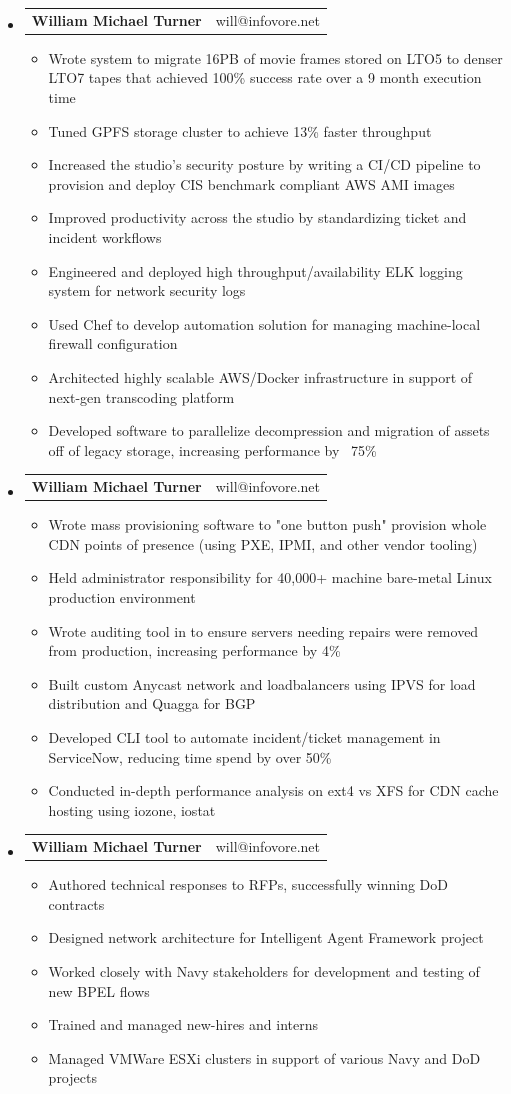 \documentclass[letterpaper,11pt]{article}
\makeatletter
\newcommand{\resitem}[1]{\item #1 \vspace{-1pt}}
\newcommand{\ressubheading}[4]{
\begin{tabular*}{7.3in}{l@{\extracolsep{\fill}}r} \color{myRed}
\textbf{\large William Michael Turner} & will@infovore.net \\
\end{tabular*}\vspace{-5pt}}
\makeatother
\begin{document}
\begin{itemize}
    \item
        \ressubheading{The Walt Disney Studios}{Glendale, CA}{Sr. Systems Engineer }{March 2015 - October 2016}
            \begin{itemize}
            \resitem{Wrote system to migrate 16PB of movie frames stored on LTO5 to denser LTO7 tapes that achieved 100\% success rate over a 9 month execution time}
            \resitem{Tuned GPFS storage cluster to achieve 13\% faster throughput}
            \resitem{Increased the studio's security posture by writing a CI/CD pipeline to provision and deploy CIS benchmark compliant AWS AMI images}
            \resitem{Improved productivity across the studio by standardizing ticket and incident workflows }
            \resitem{Engineered and deployed high throughput/availability ELK logging system for network security logs}
            \resitem{Used Chef to develop automation solution for managing machine-local firewall configuration}
            \resitem{Architected highly scalable AWS/Docker infrastructure in support of next-gen transcoding platform}
            \resitem{Developed software to parallelize decompression and migration of assets off of legacy storage, increasing performance by ~75\%}

    \end{itemize}


    \item
        \ressubheading{EdgeCast Networks}{Santa Monica, CA}{SysOps Engineer}{September 2013 - March 2015}
            \begin{itemize}
            \resitem{Wrote mass provisioning software to "one button push" provision whole CDN points of presence (using PXE, IPMI, and other vendor tooling)}
            \resitem{Held administrator responsibility for 40,000+ machine bare-metal Linux production environment}
            \resitem{Wrote auditing tool in to ensure servers needing repairs were removed from production, increasing performance by 4\%}
            \resitem{Built custom Anycast network and loadbalancers using IPVS for load distribution and Quagga for BGP}
            \resitem{Developed CLI tool to automate incident/ticket management in ServiceNow, reducing time spend by over 50\%}
            \resitem{Conducted in-depth performance analysis on ext4 vs XFS for CDN cache hosting using iozone, iostat}
    \end{itemize}

    \item
        \ressubheading{Avum Inc.}{Malibu, CA}{Research Engineer}{June 2012 - September 2013}
            \begin{itemize}
            \resitem{Authored technical responses to RFPs, successfully winning DoD contracts}
            \resitem{Designed network architecture for Intelligent Agent Framework project}
            \resitem{Worked closely with Navy stakeholders for development and testing of new BPEL flows}
            \resitem{Trained and managed new-hires and interns}
            \resitem{Managed VMWare ESXi clusters in support of various Navy and DoD projects}

    \end{itemize}
\end{itemize}
\end{document}
